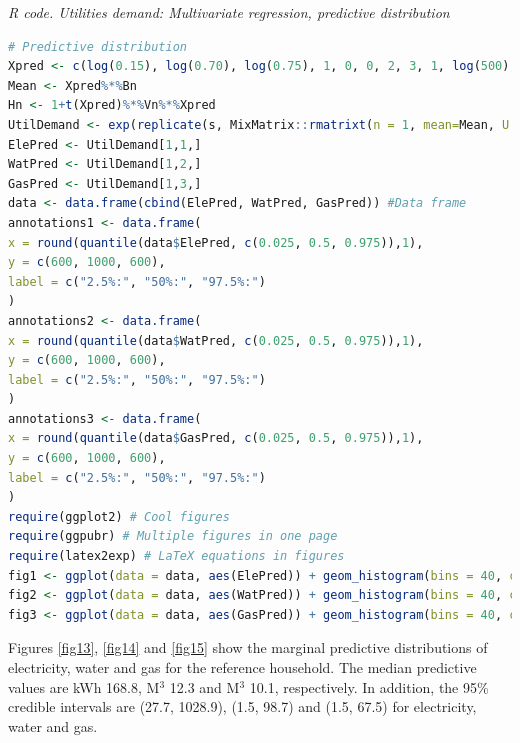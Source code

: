 \begin{enumerate}[leftmargin=*]
\begin{tcolorbox}[enhanced,width=4.67in,center upper,
	fontupper=\large\bfseries,drop shadow southwest,sharp corners]
	\textit{R code. Utilities demand: Multivariate regression, predictive distribution}
	\begin{VF}
		\begin{lstlisting}[language=R]
# Predictive distribution
Xpred <- c(log(0.15), log(0.70), log(0.75), 1, 0, 0, 2, 3, 1, log(500), 1)
Mean <- Xpred%*%Bn
Hn <- 1+t(Xpred)%*%Vn%*%Xpred
UtilDemand <- exp(replicate(s, MixMatrix::rmatrixt(n = 1, mean=Mean, U = Hn, V = Psin, df = an + 1 - M)))
ElePred <- UtilDemand[1,1,]
WatPred <- UtilDemand[1,2,]
GasPred <- UtilDemand[1,3,]
data <- data.frame(cbind(ElePred, WatPred, GasPred)) #Data frame
annotations1 <- data.frame(
x = round(quantile(data$ElePred, c(0.025, 0.5, 0.975)),1),
y = c(600, 1000, 600),
label = c("2.5%:", "50%:", "97.5%:")
)
annotations2 <- data.frame(
x = round(quantile(data$WatPred, c(0.025, 0.5, 0.975)),1),
y = c(600, 1000, 600),
label = c("2.5%:", "50%:", "97.5%:")
)
annotations3 <- data.frame(
x = round(quantile(data$GasPred, c(0.025, 0.5, 0.975)),1),
y = c(600, 1000, 600),
label = c("2.5%:", "50%:", "97.5%:")
)
require(ggplot2) # Cool figures
require(ggpubr) # Multiple figures in one page
require(latex2exp) # LaTeX equations in figures
fig1 <- ggplot(data = data, aes(ElePred)) + geom_histogram(bins = 40, color = "#000000", fill = "#0099F8") + 	xlab("kWh") + ylab("Frequency") +	ggtitle("Electricity") + xlim(0, 1050) + geom_text(data = annotations1, aes(x = x, y = y, label = paste(label, x)), size = 3, fontface = "bold")
fig2 <- ggplot(data = data, aes(WatPred)) + geom_histogram(bins = 40, color = "#000000", fill = "#0099F8") + 	xlab(TeX("$M^3$")) + ylab("Frequency") +	ggtitle("Water") + xlim(0, 100) + geom_text(data = annotations2, aes(x = x, y = y, label = paste(label, x)), size = 3, fontface = "bold")
fig3 <- ggplot(data = data, aes(GasPred)) + geom_histogram(bins = 40, color = "#000000", fill = "#0099F8") + 	xlab(TeX("$M^3$")) + ylab("Frequency") +	ggtitle("Gas") + xlim(0, 80) + geom_text(data = annotations3, aes(x = x, y = y, label = paste(label, x)), size = 3, fontface = "bold")
		\end{lstlisting}
	\end{VF}
\end{tcolorbox} 


Figures \ref{fig13}, \ref{fig14} and \ref{fig15} show the marginal predictive distributions of electricity, water and gas for the reference household. The median predictive values are kWh 168.8, M$^3$ 12.3 and M$^3$ 10.1, respectively. In addition, the 95\% credible intervals are (27.7, 1028.9), (1.5, 98.7) and (1.5, 67.5) for electricity, water and gas.  


\end{enumerate}
